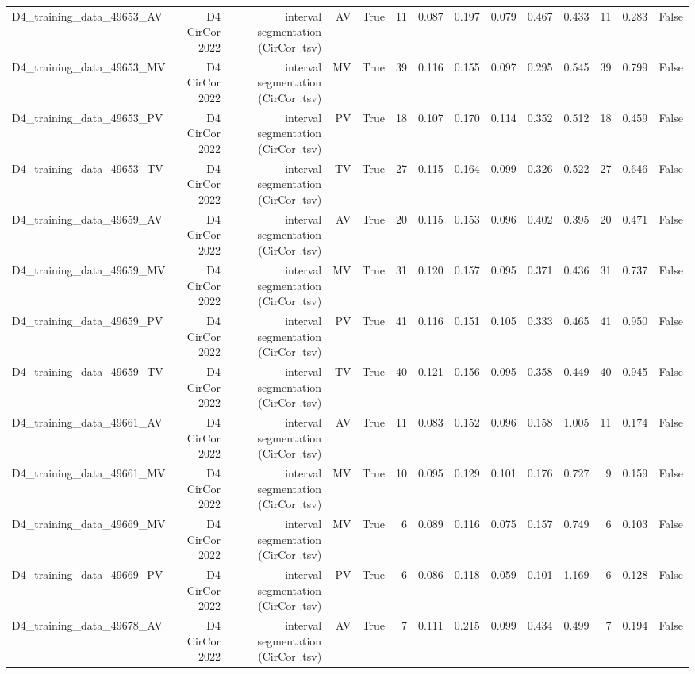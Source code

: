 \begin{table}[htbp]
\begin{tabular}{lrrrrrrrrrrrrr}
    D4\_training\_data\_49653\_AV & D4 CirCor 2022 & interval segmentation (CirCor .tsv) & AV & True & 11 & 0.087 & 0.197 & 0.079 & 0.467 & 0.433 & 11 & 0.283 & False \\
    D4\_training\_data\_49653\_MV & D4 CirCor 2022 & interval segmentation (CirCor .tsv) & MV & True & 39 & 0.116 & 0.155 & 0.097 & 0.295 & 0.545 & 39 & 0.799 & False \\
    D4\_training\_data\_49653\_PV & D4 CirCor 2022 & interval segmentation (CirCor .tsv) & PV & True & 18 & 0.107 & 0.170 & 0.114 & 0.352 & 0.512 & 18 & 0.459 & False \\
    D4\_training\_data\_49653\_TV & D4 CirCor 2022 & interval segmentation (CirCor .tsv) & TV & True & 27 & 0.115 & 0.164 & 0.099 & 0.326 & 0.522 & 27 & 0.646 & False \\
    D4\_training\_data\_49659\_AV & D4 CirCor 2022 & interval segmentation (CirCor .tsv) & AV & True & 20 & 0.115 & 0.153 & 0.096 & 0.402 & 0.395 & 20 & 0.471 & False \\
    D4\_training\_data\_49659\_MV & D4 CirCor 2022 & interval segmentation (CirCor .tsv) & MV & True & 31 & 0.120 & 0.157 & 0.095 & 0.371 & 0.436 & 31 & 0.737 & False \\
    D4\_training\_data\_49659\_PV & D4 CirCor 2022 & interval segmentation (CirCor .tsv) & PV & True & 41 & 0.116 & 0.151 & 0.105 & 0.333 & 0.465 & 41 & 0.950 & False \\
    D4\_training\_data\_49659\_TV & D4 CirCor 2022 & interval segmentation (CirCor .tsv) & TV & True & 40 & 0.121 & 0.156 & 0.095 & 0.358 & 0.449 & 40 & 0.945 & False \\
    D4\_training\_data\_49661\_AV & D4 CirCor 2022 & interval segmentation (CirCor .tsv) & AV & True & 11 & 0.083 & 0.152 & 0.096 & 0.158 & 1.005 & 11 & 0.174 & False \\
    D4\_training\_data\_49661\_MV & D4 CirCor 2022 & interval segmentation (CirCor .tsv) & MV & True & 10 & 0.095 & 0.129 & 0.101 & 0.176 & 0.727 & 9 & 0.159 & False \\
    D4\_training\_data\_49669\_MV & D4 CirCor 2022 & interval segmentation (CirCor .tsv) & MV & True & 6 & 0.089 & 0.116 & 0.075 & 0.157 & 0.749 & 6 & 0.103 & False \\
    D4\_training\_data\_49669\_PV & D4 CirCor 2022 & interval segmentation (CirCor .tsv) & PV & True & 6 & 0.086 & 0.118 & 0.059 & 0.101 & 1.169 & 6 & 0.128 & False \\
    D4\_training\_data\_49678\_AV & D4 CirCor 2022 & interval segmentation (CirCor .tsv) & AV & True & 7 & 0.111 & 0.215 & 0.099 & 0.434 & 0.499 & 7 & 0.194 & False \\

\end{tabular}
\end{table}
